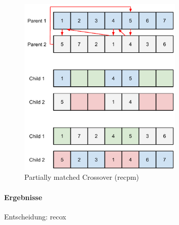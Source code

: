 \begin{figure}[h!]
  \centering
  \includegraphics[width=0.7\textwidth]{Figures/recpm.pdf}
  \caption{Partially matched Crossover (recpm)}\label{fig.recpm}
\end{figure}


\paragraph{Ergebnisse}


Entscheidung: recox

